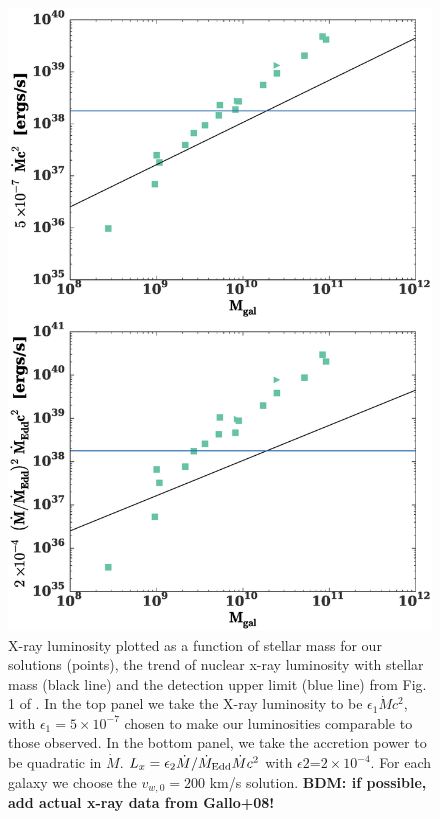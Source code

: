 \documentclass[usenatbib,fleqn]{mn2e}
\newcommand{\Mdot}{\dot{M}}
\newcommand{\eddr}{\dot{M}/\dot{M}_{\rm Edd}}
\newcommand{\vwO}{v_{w,0}}
\begin{document}
\begin{figure}
\includegraphics[width=\columnwidth]{bh_xray.eps}
\caption{\label{fig:bh_xray} X-ray luminosity plotted as a function of
  stellar mass for our solutions (points), the trend of nuclear x-ray
  luminosity with stellar mass (black line) and the detection upper
  limit (blue line) from Fig. 1 of \citealt{MillerGallo+:2014a}. In
  the top panel we take the X-ray luminosity to be $\epsilon_1 \Mdot
  c^2$, with $\epsilon_1=5\times 10^{-7}$ chosen to make our
  luminosities comparable to those observed. In the bottom panel, we
  take the accretion power to be quadratic in $\Mdot$. $L_x=\epsilon_2
  \eddr \Mdot c^2$ with $\epsilon2$=$2\times10^{-4}$. For each galaxy
  we choose the $\vwO=200$ km/s solution.  {\bf BDM: if possible, add actual x-ray data from Gallo+08!}}
\end{figure}
\end{document}

